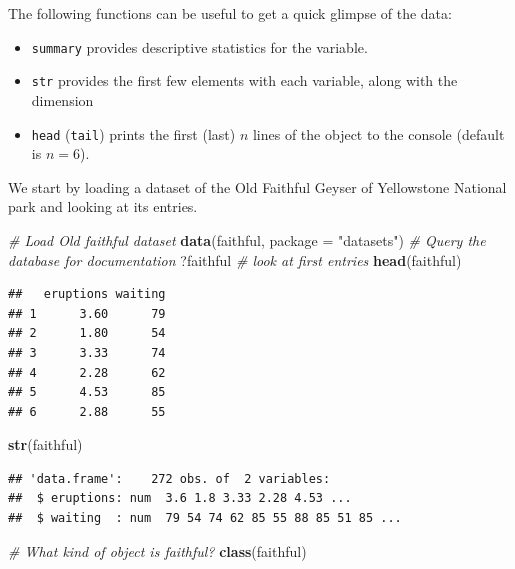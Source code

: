 \documentclass[
  11pt,
  letterpaper,
]{book}
\newenvironment{Shaded}{\begin{snugshade}}{\end{snugshade}}
\newcommand{\CommentTok}[1]{\textcolor[rgb]{0.56,0.35,0.01}{\textit{#1}}}
\newcommand{\DataTypeTok}[1]{\textcolor[rgb]{0.13,0.29,0.53}{#1}}
\newcommand{\KeywordTok}[1]{\textcolor[rgb]{0.13,0.29,0.53}{\textbf{#1}}}
\newcommand{\NormalTok}[1]{#1}
\newcommand{\StringTok}[1]{\textcolor[rgb]{0.31,0.60,0.02}{#1}}
\providecommand{\tightlist}{%
  \setlength{\itemsep}{0pt}\setlength{\parskip}{0pt}}
\theoremstyle{definition}
\theoremstyle{definition}
\theoremstyle{definition}
\theoremstyle{remark}
\begin{document}
The following functions can be useful to get a quick glimpse of the data:

\begin{itemize}
\tightlist
\item
  \texttt{summary} provides descriptive statistics for the variable.
\item
  \texttt{str} provides the first few elements with each variable, along with the dimension
\item
  \texttt{head} (\texttt{tail}) prints the first (last) \(n\) lines of the object to the console (default is \(n=6\)).
\end{itemize}

We start by loading a dataset of the Old Faithful Geyser of Yellowstone National park and looking at its entries.

\begin{Shaded}
\begin{Highlighting}[]
\CommentTok{\# Load Old faithful dataset}
\KeywordTok{data}\NormalTok{(faithful, }\DataTypeTok{package =} \StringTok{"datasets"}\NormalTok{)}
\CommentTok{\# Query the database for documentation}
\NormalTok{?faithful}
\CommentTok{\# look at first entries}
\KeywordTok{head}\NormalTok{(faithful)}
\end{Highlighting}
\end{Shaded}

\begin{verbatim}
##   eruptions waiting
## 1      3.60      79
## 2      1.80      54
## 3      3.33      74
## 4      2.28      62
## 5      4.53      85
## 6      2.88      55
\end{verbatim}

\begin{Shaded}
\begin{Highlighting}[]
\KeywordTok{str}\NormalTok{(faithful)}
\end{Highlighting}
\end{Shaded}

\begin{verbatim}
## 'data.frame':	272 obs. of  2 variables:
##  $ eruptions: num  3.6 1.8 3.33 2.28 4.53 ...
##  $ waiting  : num  79 54 74 62 85 55 88 85 51 85 ...
\end{verbatim}

\begin{Shaded}
\begin{Highlighting}[]
\CommentTok{\# What kind of object is faithful? }
\KeywordTok{class}\NormalTok{(faithful)}
\end{Highlighting}
\end{Shaded}
\end{document}
